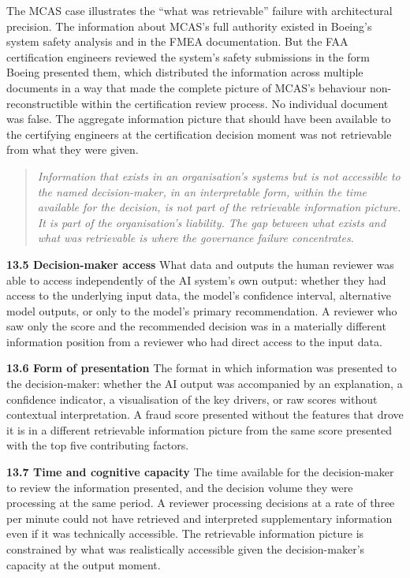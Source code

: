 The MCAS case illustrates the ``what was retrievable'' failure with architectural precision. The information about MCAS's full authority existed in Boeing's system safety analysis and in the FMEA documentation. But the FAA certification engineers reviewed the system's safety submissions in the form Boeing presented them, which distributed the information across multiple documents in a way that made the complete picture of MCAS's behaviour non-reconstructible within the certification review process. No individual document was false. The aggregate information picture that should have been available to the certifying engineers at the certification decision moment was not retrievable from what they were given.

\begin{quote}
\emph{Information that exists in an organisation's systems but is not accessible to the named decision-maker, in an interpretable form, within the time available for the decision, is not part of the retrievable information picture. It is part of the organisation's liability. The gap between what exists and what was retrievable is where the governance failure concentrates.}
\end{quote}

\textbf{13.5 Decision-maker access} What data and outputs the human reviewer was able to access independently of the AI system's own output: whether they had access to the underlying input data, the model's confidence interval, alternative model outputs, or only to the model's primary recommendation. A reviewer who saw only the score and the recommended decision was in a materially different information position from a reviewer who had direct access to the input data.

\textbf{13.6 Form of presentation} The format in which information was presented to the decision-maker: whether the AI output was accompanied by an explanation, a confidence indicator, a visualisation of the key drivers, or raw scores without contextual interpretation. A fraud score presented without the features that drove it is in a different retrievable information picture from the same score presented with the top five contributing factors.

\textbf{13.7 Time and cognitive capacity} The time available for the decision-maker to review the information presented, and the decision volume they were processing at the same period. A reviewer processing decisions at a rate of three per minute could not have retrieved and interpreted supplementary information even if it was technically accessible. The retrievable information picture is constrained by what was realistically accessible given the decision-maker's capacity at the output moment.

